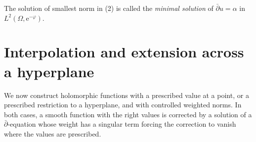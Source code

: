 The solution of smallest norm in (2) is called the \emph{minimal solution} of $\bar\partial u=\alpha$ in $L^2(\Omega,\mathrm e^{-\varphi})$.

\section{Interpolation and extension across a hyperplane}
\label{sec:weighted-interpolation-extension}

We now construct holomorphic functions with a prescribed value at a point, or a prescribed restriction to a hyperplane, and with controlled weighted norms. In both cases, a smooth function with the right values is corrected by a solution of a $\bar\partial$-equation whose weight has a singular term forcing the correction to vanish where the values are prescribed.

